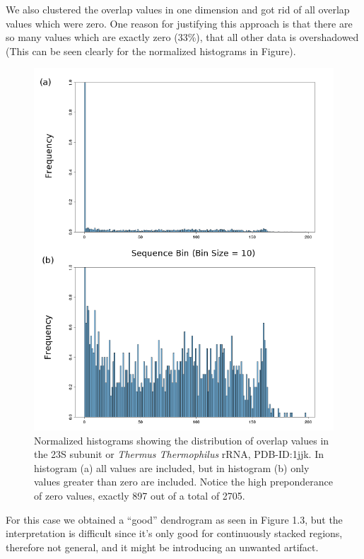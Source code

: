 We also clustered the overlap values in one dimension and got rid of
all overlap values which were zero. One reason for justifying this approach 
is that there are so many values which are exactly zero (33\%), that all other data
is overshadowed (This can be seen clearly for the normalized histograms in Figure).
\begin{figure}[htbp]
\centering 
\includegraphics[angle=0, scale=0.8]{Chapter5/histocompare.png}
\caption{Normalized histograms showing the distribution of overlap values in 
the 23S subunit or \textit{Thermus Thermophilus} rRNA, PDB-ID:1jjk. In histogram 
(a) all values are included, but in histogram (b) only values greater than zero are 
included. Notice the high preponderance of zero values, exactly 897 out of a total
of 2705.}
\end{figure}
For this case we obtained a ``good'' dendrogram as seen in Figure 1.3, but the interpretation is
difficult since it's only good for continuously stacked regions, therefore not
general, and it might be introducing an unwanted artifact.
